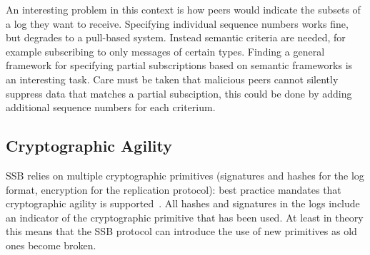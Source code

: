 \documentclass[9pt,sigconf]{acmart}
\begin{document}
An interesting problem in this context is how peers would indicate the subsets of a log they want to receive. Specifying individual sequence numbers works fine, but degrades to a pull-based system. Instead semantic criteria are needed, for example subscribing to only messages of certain types. Finding a general framework for specifying partial subscriptions based on semantic frameworks is an interesting task. Care must be taken that malicious peers cannot silently suppress data that matches a partial subsciption, this could be done by adding additional sequence numbers for each criterium.
%
%
%



\subsection{Cryptographic Agility}


SSB relies on multiple cryptographic primitives (signatures and hashes for the log format, encryption for the replication protocol): best practice mandates that cryptographic agility is supported~\cite{nelson2011crypto}. All hashes and signatures in the logs include an indicator of the cryptographic primitive that has been used. At least in theory this means that the SSB protocol can introduce the use of new primitives as old ones become broken.
\end{document}
